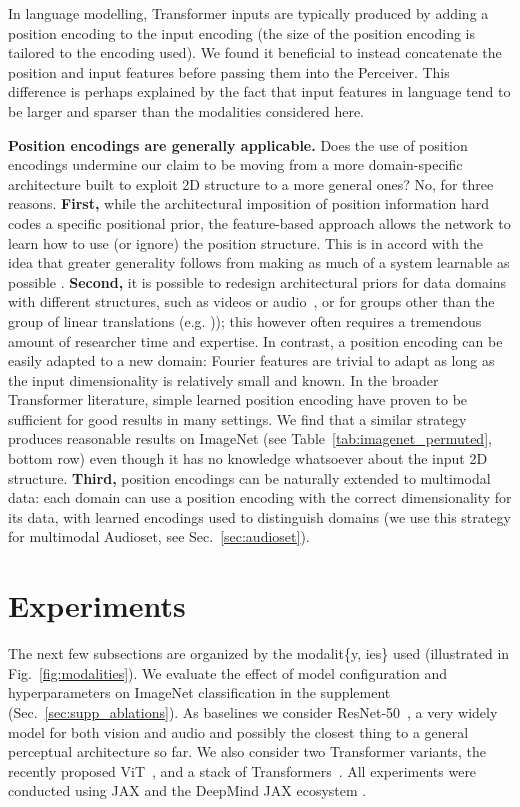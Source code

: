 \documentclass{article}
\begin{document}
In language modelling, Transformer inputs are typically produced by adding a position encoding to the input encoding (the size of the position encoding is tailored to the encoding used). We found it beneficial to instead concatenate the position and input features before passing them into the Perceiver. This difference is perhaps explained by the fact that input features in language tend to be larger and sparser than the modalities considered here.

\noindent \textbf{Position encodings are generally applicable.} Does the use of position encodings undermine our claim to be moving from a more domain-specific architecture built to exploit 2D structure to a more general ones? No, for three reasons. \textbf{First,} while the architectural imposition of position information hard codes a specific positional prior, the feature-based approach allows the network to learn how to use (or ignore) the position structure. This is in accord with the idea that greater generality follows from making as much of a system learnable as possible \cite{sutton2019bitter}. \textbf{Second,} it is possible to redesign architectural priors for data domains with different structures, such as videos \cite{tran2015learning} or audio~\cite{ford2019deep}, or for groups other than the group of linear translations (e.g. \citealt{cohen2016group, bronstein2017geometric, esteves2018learning})); this however often requires a tremendous amount of researcher time and expertise. In contrast, a position encoding can be easily adapted to a new domain: Fourier features are trivial to adapt as long as the input dimensionality is relatively small and known. In the broader Transformer literature, simple learned position encoding have proven to be sufficient for good results in many settings. We find that a similar strategy produces reasonable results on ImageNet (see Table~\ref{tab:imagenet_permuted}, bottom row) even though it has no knowledge whatsoever about the input 2D structure. \textbf{Third,} position encodings can be naturally extended to multimodal data: each domain can use a position encoding with the correct dimensionality for its data, with learned encodings used to distinguish domains (we use this strategy for multimodal Audioset, see Sec.~\ref{sec:audioset}).

\section{Experiments}

The next few subsections are organized by the modalit\{y, ies\} used (illustrated in Fig.~\ref{fig:modalities}). We evaluate the effect of model configuration and hyperparameters on ImageNet classification in the supplement (Sec.~\ref{sec:supp_ablations}). As baselines we consider ResNet-50~\cite{he2016deep}, a very widely model for both vision and audio and possibly the closest thing to a general perceptual architecture so far. We also consider two Transformer variants, the recently proposed ViT~\cite{dosovitskiy2020image}, and a stack of Transformers~\cite{vaswani2017attention}. All experiments were conducted using JAX \cite{jax2018github} and the DeepMind JAX ecosystem \cite{deepmind2020jax}.
\end{document}
